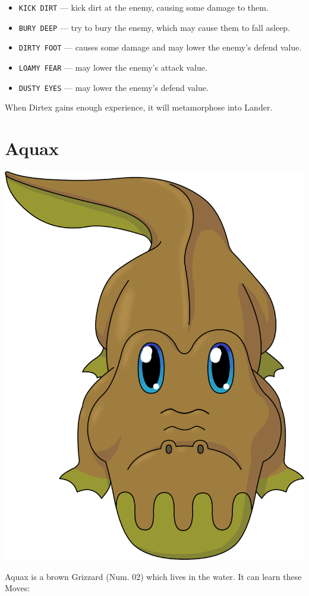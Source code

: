 \documentclass[10pt,twocolumn,openany,article]{memoir}
\begin{document}
\begin{itemize}
\item \texttt{KICK DIRT} --- kick dirt at the enemy, causing some damage
  to them.
\item \texttt{BURY DEEP} --- try to bury the enemy, which may cause them
  to fall asleep.
\item  \texttt{DIRTY FOOT}  --- causes  some  damage and  may lower  the
  enemy's defend value.
\item \texttt{LOAMY FEAR} --- may lower the enemy's attack value.
\item \texttt{DUSTY EYES} --- may lower the enemy's defend value.
\end{itemize}

When Dirtex gains enough experience, it will metamorphose into Lander.

\fi

\section{Aquax}

\begin{center}
  \includegraphics[width=.75\columnwidth]{../Manual/Aquax.png}
\end{center}


Aquax is  a brown Grizzard  (Num. 02) which lives  in the water.  It can
learn these Moves:
\end{document}
